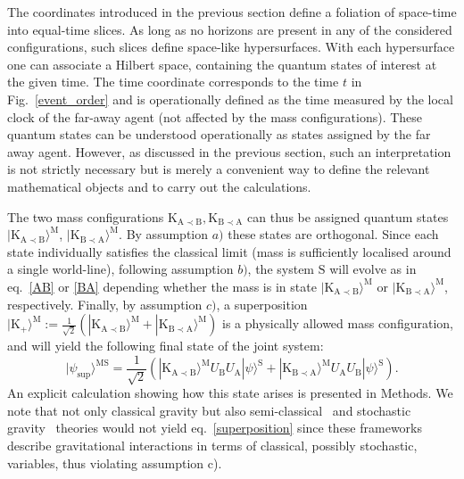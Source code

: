 \documentclass[a4paper,11pt]{article}
\newcommand{\ket}{\rangle}
\begin{document}
The coordinates introduced in the previous section define a foliation of space-time into equal-time slices. As long as no horizons are present in any of the considered configurations, such slices define space-like hypersurfaces.  With each hypersurface one can associate a Hilbert space, containing the quantum states of interest at the given time.  The time coordinate corresponds to the time $t$ in Fig.~\ref{event_order} and is operationally defined as the time measured by the local clock of the far-away agent (not affected by the mass configurations).
These quantum states can be understood operationally as states assigned by the far away agent. However, as discussed in the previous section, such an interpretation is not strictly necessary but is merely a convenient way to define the relevant mathematical objects and to carry out the calculations.

The two mass configurations $\mathrm{K_{A\prec B}}, \mathrm{K_{B\prec A}}$ can thus be assigned quantum states $|\mathrm{K_{A\prec B}}\ket^\mathrm M$, $|\mathrm{K_{B\prec A}}\ket^\mathrm M$. By assumption $a)$ these states are orthogonal. Since each state {individually} satisfies the classical limit (mass %
is sufficiently localised around a single world-line), following assumption $b)$, the system $\mathrm S$ will evolve as in eq.~\eqref{AB} or \eqref{BA} depending whether the mass is in state $|\mathrm{K_{A\prec B}}\ket^\mathrm M$ or $|\mathrm{K_{B\prec A}}\ket^\mathrm M$, respectively. Finally, by assumption $c)$, a superposition $|\mathrm{K_{+}}\ket^\mathrm M := \frac{1}{\sqrt{2}}\left( |\mathrm{K_{A\prec B}}\ket^\mathrm M + |\mathrm{K_{B\prec A}}\ket^\mathrm M\right)$ is a physically {allowed} mass configuration, and will yield the following final state of the joint system:
\begin{equation}
|\psi_{\textrm{sup}}\ket^{\mathrm{MS}} = \frac{1}{\sqrt{2}}\left(|\mathrm{K_{A\prec B}}\ket^\mathrm M U_\mathrm{B}U_\mathrm{A}|\psi\ket^\mathrm{S} + |\mathrm{K_{B\prec A}}\ket^\mathrm M U_\mathrm{A}U_\mathrm{B}|\psi\ket^\mathrm{S}\right).
\label{superposition}
\end{equation}
%
An explicit calculation showing how this state arises is presented in Methods. %
We note that not only classical gravity but also semi-classical~\cite{kiefer2012quantum} and stochastic gravity~\cite{Hu_Verdaguer:2003} theories would not yield eq.~\eqref{superposition} since these frameworks describe gravitational interactions in terms of classical, possibly stochastic, variables, thus violating assumption c).
\end{document}
